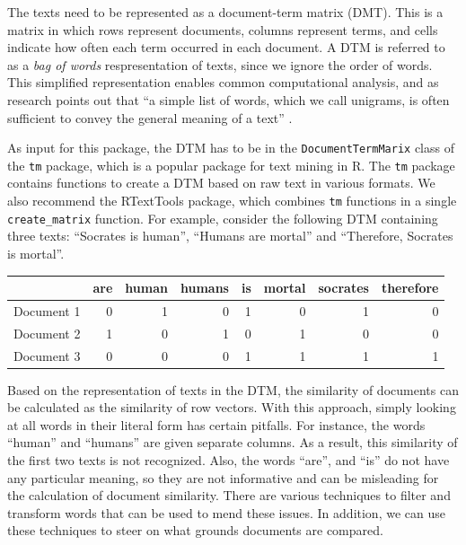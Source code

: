 \documentclass[]{article}
\begin{document}
The texts need to be represented as a document-term matrix (DMT). This
is a matrix in which rows represent documents, columns represent terms,
and cells indicate how often each term occurred in each document. A DTM
is referred to as a \emph{bag of words} respresentation of texts, since
we ignore the order of words. This simplified representation enables
common computational analysis, and as research points out that ``a
simple list of words, which we call unigrams, is often sufficient to
convey the general meaning of a text'' \citep[6]{grimmer13}.

As input for this package, the DTM has to be in the
\texttt{DocumentTermMarix} class of the \texttt{tm} package, which is a
popular package for text mining in R. The \texttt{tm} package contains
functions to create a DTM based on raw text in various formats. We also
recommend the RTextTools package, which combines \texttt{tm} functions
in a single \texttt{create\_matrix} function. For example, consider the
following DTM containing three texts: ``Socrates is human'', ``Humans
are mortal'' and ``Therefore, Socrates is mortal''.

\begin{longtable}[c]{@{}lrrrrrrr@{}}
\toprule
& are & human & humans & is & mortal & socrates &
therefore\tabularnewline
\midrule
\endhead
Document 1 & 0 & 1 & 0 & 1 & 0 & 1 & 0\tabularnewline
Document 2 & 1 & 0 & 1 & 0 & 1 & 0 & 0\tabularnewline
Document 3 & 0 & 0 & 0 & 1 & 1 & 1 & 1\tabularnewline
\bottomrule
\end{longtable}

Based on the representation of texts in the DTM, the similarity of
documents can be calculated as the similarity of row vectors. With this
approach, simply looking at all words in their literal form has certain
pitfalls. For instance, the words ``human'' and ``humans'' are given
separate columns. As a result, this similarity of the first two texts is
not recognized. Also, the words ``are'', and ``is'' do not have any
particular meaning, so they are not informative and can be misleading
for the calculation of document similarity. There are various techniques
to filter and transform words that can be used to mend these issues. In
addition, we can use these techniques to steer on what grounds documents
are compared.
\end{document}
